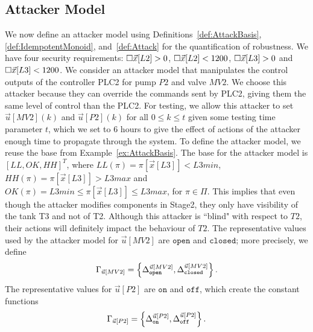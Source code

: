{{\subsection{Attacker Model}%
We now define an attacker model using Definitions~\ref{def:AttackBasis}, \ref{def:IdempotentMonoid}, and~\ref{def:Attack} for the quantification of robustness. We have four security requirements: ${{\square}}{\vec{x}[L2]>0}$, ${{\square}}{\vec{x}[L2]<1200}$, ${{\square}}{\vec{x}[L3]>0}$ and ${{\square}}{\vec{x}[L3]<1200}$. 
We consider an attacker model that manipulates the control outputs of the controller PLC2 for pump $P2$ and valve $MV2$. We choose this attacker because they can override the commands sent by PLC2, giving them the same level of control than the PLC2. For testing, we allow this attacker to set $\vec{u}[MV2](k)$ and $\vec{u}[P2](k)$ for all $0\leq k\leq t$ given some testing time parameter $t$, which we set to 6 hours to give the effect of actions of the attacker enough time to propagate through the system. To define the attacker model, we reuse the base from Example~\ref{ex:AttackBasis}. The base for the attacker model is $[LL, OK, HH]^T$, where ${LL}(\pi)=\pi[\vec{x}[L3]]<L3min$, ${HH}(\pi)=\pi[\vec{x}[L3]]>L3max$ and ${OK}(\pi)=L3min \leq \pi[\vec{x}[L3]]\leq L3max$, for $\pi \in \Pi$. This implies that even though the attacker modifies components in Stage2, they only have visibility of the tank T3 and not of T2. Although this attacker is ``blind" with respect to $T2$, their actions will definitely impact the behaviour of $T2$. The representative values used by the attacker model for $\vec{u}[MV2]$ are $\texttt{open}$ and $\texttt{closed}$; more precisely, we define
\begin{align*}
  \Gamma_{\vec{u}[MV2]}=\left\{{\Delta}^{\vec{u}[MV2]}_{\texttt{open}}, {\Delta}^{\vec{u}[MV2]}_{\texttt{closed}}\right\}.
\end{align*}
The representative values for $\vec{u}[P2]$ are $\texttt{on}$ and $\texttt{off}$, which create the constant functions
\begin{align*}
  \Gamma_{\vec{u}[P2]}=\left\{{\Delta}^{\vec{u}[P2]}_{\texttt{on}}, {\Delta}^{\vec{u}[P2]}_{\texttt{off}}\right\}.
\end{align*}
}}
